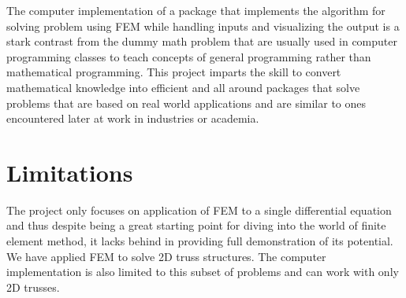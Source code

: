 The computer implementation of a package that implements the algorithm for solving problem using FEM while handling inputs and visualizing the output is a stark contrast from the dummy math problem that are usually used in computer programming classes to teach concepts of general programming rather than mathematical programming. This project imparts the skill to convert mathematical knowledge into efficient and all around packages that solve problems that are based on real world applications and are similar to ones encountered later at work in industries or academia.

\section{\bf Limitations}

The project only focuses on application of FEM to a single differential equation and thus despite being a great starting point for diving into the world of finite element method, it lacks behind in providing full demonstration of its potential. We have applied FEM to solve 2D truss structures. The computer implementation is also limited to this subset of problems and can work with only 2D trusses.
